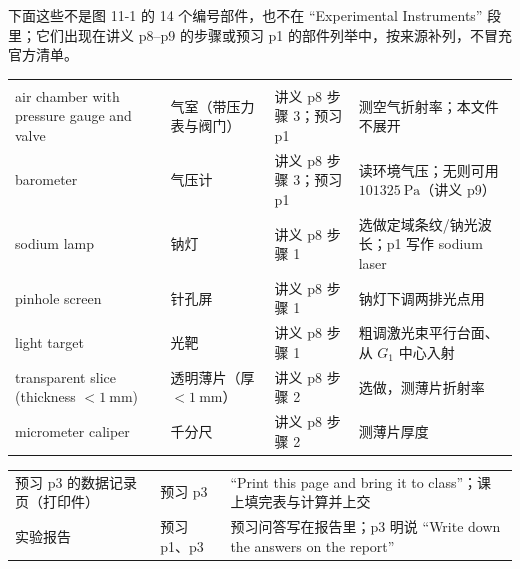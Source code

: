 \documentclass[11pt]{ctexart}
\begin{document}

下面这些不是图 11-1 的 14 个编号部件，也不在 “Experimental Instruments” 段里；它们出现在讲义 p8--p9 的步骤或预习 p1 的部件列举中，按来源补列，不冒充官方清单。

\begin{center}
\small
\begin{longtable}{@{}L{4.4cm}L{3.9cm}L{2.4cm}L{5.0cm}@{}}
\toprule
{} &  &  & \\
\midrule
\endfirsthead
\toprule
{} &  &  & \\
\midrule
\endhead
air chamber with pressure gauge and valve & 气室（带压力表与阀门） & 讲义 p8 步骤 3；预习 p1 & 测空气折射率；本文件不展开\\
barometer & 气压计 & 讲义 p8 步骤 3；预习 p1 & 读环境气压；无则可用 \(101325\ \mathrm{Pa}\)（讲义 p9）\\
sodium lamp & 钠灯 & 讲义 p8 步骤 1 & 选做定域条纹/钠光波长；p1 写作 sodium laser\\
pinhole screen & 针孔屏 & 讲义 p8 步骤 1 & 钠灯下调两排光点用\\
light target & 光靶 & 讲义 p8 步骤 1 & 粗调激光束平行台面、从 \(G_1\) 中心入射\\
transparent slice (thickness \(<1\ \mathrm{mm}\)) & 透明薄片（厚 \(<1\ \mathrm{mm}\)） & 讲义 p8 步骤 2 & 选做，测薄片折射率\\
micrometer caliper & 千分尺 & 讲义 p8 步骤 2 & 测薄片厚度\\
\bottomrule
\end{longtable}
\end{center}


\begin{center}
\small
\begin{tabular}{@{}L{6.0cm}L{4.2cm}L{6.0cm}@{}}
\toprule
{} &  & \\
\midrule
预习 p3 的数据记录页（打印件） & 预习 p3 & “Print this page and bring it to class”；课上填完表与计算并上交\\
实验报告 & 预习 p1、p3 & 预习问答写在报告里；p3 明说 “Write down the answers on the report”\\
\bottomrule
\end{tabular}
\end{center}

\end{document}
